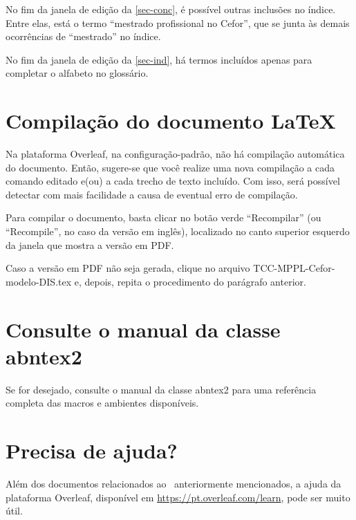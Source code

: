 No fim da janela de edição da \autoref{sec-conc}, é possível outras inclusões no índice. Entre elas, está o termo ``mestrado profissional no Cefor'', que se junta às demais ocorrências de ``mestrado'' no índice.

No fim da janela de edição da \autoref{sec-ind}, há termos incluídos apenas para completar o alfabeto no glossário.


\section{Compilação do documento \LaTeX}

Na plataforma Overleaf, na configuração-padrão, não há compilação automática do documento. Então, sugere-se que você realize uma nova compilação a cada comando editado e(ou) a cada trecho de texto incluído. Com isso, será possível detectar com mais facilidade a causa de eventual erro de compilação.

Para compilar o documento, basta clicar no botão verde ``Recompilar'' (ou ``Recompile'', no caso da versão em inglês), localizado no canto superior esquerdo da janela que mostra a versão em PDF.

Caso a versão em PDF não seja gerada, clique no arquivo \textsf{TCC-MPPL-Cefor-modelo-DIS.tex} e, depois, repita o procedimento do parágrafo anterior.

\section{Consulte o manual da classe \textsf{abntex2}}

Se for desejado, consulte o manual da classe \textsf{abntex2} \cite{abntex2classe} para uma referência completa das macros e ambientes disponíveis. 

\section{Precisa de ajuda?}

Além dos documentos relacionados ao \abnTeX\ anteriormente mencionados, a ajuda da plataforma Overleaf, disponível em \url{https://pt.overleaf.com/learn}, pode ser muito útil.

